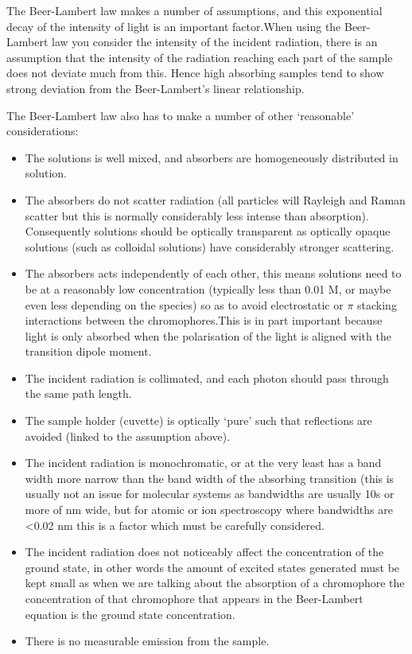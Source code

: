 \documentclass[
]{book}
\providecommand{\tightlist}{%
  \setlength{\itemsep}{0pt}\setlength{\parskip}{0pt}}
\begin{document}
The Beer-Lambert law makes a number of assumptions, and this exponential decay of the intensity of light is an important factor.When using the Beer-Lambert law you consider the intensity of the incident radiation, there is an assumption that the intensity of the radiation reaching each part of the sample does not deviate much from this. Hence high absorbing samples tend to show strong deviation from the Beer-Lambert's linear relationship.

The Beer-Lambert law also has to make a number of other `reasonable' considerations:

\begin{itemize}
\tightlist
\item
  The solutions is well mixed, and absorbers are homogeneously distributed in solution.
\item
  The absorbers do not scatter radiation (all particles will Rayleigh and Raman scatter but this is normally considerably less intense than absorption). Consequently solutions should be optically transparent as optically opaque solutions (such as colloidal solutions) have considerably stronger scattering.
\item
  The absorbers acts independently of each other, this means solutions need to be at a reasonably low concentration (typically less than 0.01 M, or maybe even less depending on the species) so as to avoid electrostatic or \(\pi\) stacking interactions between the chromophores.This is in part important because light is only absorbed when the polarisation of the light is aligned with the transition dipole moment.
\item
  The incident radiation is collimated, and each photon should pass through the same path length.
\item
  The sample holder (cuvette) is optically `pure' such that reflections are avoided (linked to the assumption above).
\item
  The incident radiation is monochromatic, or at the very least has a band width more narrow than the band width of the absorbing transition (this is usually not an issue for molecular systems as bandwidths are usually 10s or more of nm wide, but for atomic or ion spectroscopy where bandwidths are \textless0.02 nm this is a factor which must be carefully considered.
\item
  The incident radiation does not noticeably affect the concentration of the ground state, in other words the amount of excited states generated must be kept small as when we are talking about the absorption of a chromophore the concentration of that chromophore that appears in the Beer-Lambert equation is the ground state concentration.
\item
  There is no measurable emission from the sample.
\end{itemize}
\end{document}

